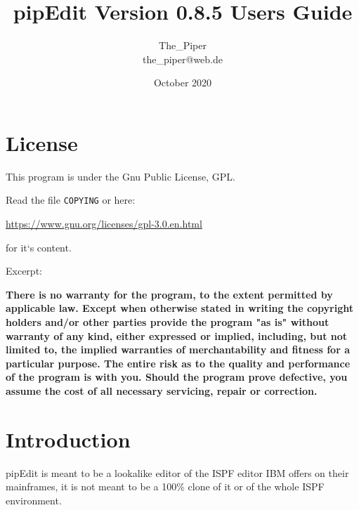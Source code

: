 \documentclass{report}
\begin{document}
\title{\huge \textbf{pipEdit} 
\break \break \small Version 0.8.5 \huge 
\break \break Users Guide \break \break \break}

\author{The\_Piper \\ the\_piper@web.de}
\date{October 2020}
\maketitle
\tableofcontents
\chapter{License}
This program is under the Gnu Public License, GPL.  \\ \break

Read the file \texttt{COPYING} or here:  \\ \break

\url{https://www.gnu.org/licenses/gpl-3.0.en.html}   \\ \break

for it‘s content. \\ \break

Excerpt: \\ \break

\textbf{    There is no warranty for the program, to the extent permitted by
	 applicable law.  Except when otherwise stated in writing the copyright
	 holders and/or other parties provide the program "as is" without warranty
	 of any kind, either expressed or implied, including, but not limited to,
	 the implied warranties of merchantability and fitness for a particular
	 purpose.  
	 \huge The entire risk as to the quality and performance of the program is with you. \normalsize
	 Should the program prove defective, you assume the cost of
	 all necessary servicing, repair or correction.
}

\chapter{Introduction}

pipEdit is meant to be a lookalike editor of the ISPF editor IBM offers on their mainframes, it is not meant to be a 100\% clone of it or of the whole ISPF environment. 
\end{document}
